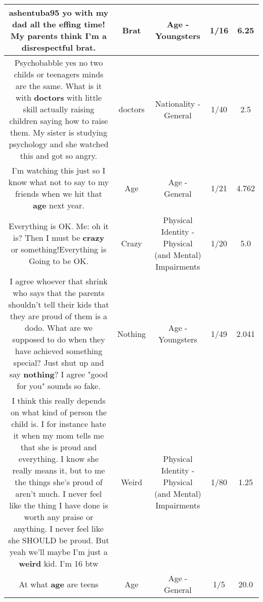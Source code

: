 \documentclass[11pt]{article}
\newlength\mylength
\begin{document}
\begin{center}
\begin{longtable}{|C{.65\mylength}|C{.30\mylength}|C{.12\mylength}|C{.12\mylength}|C{.12\mylength}|}
  \small ashentuba95  yo with my dad all the effing time! My parents think I'm a disrespectful \textbf{brat}.\normalsize   & Brat & Age - Youngsters & 1/16 & 6.25 \\  \hline
  \small Psychobabble yes no two childs or teenagers minds are the same. What is it with \textbf{doctors} with little skill actually raising children saying how to raise them. My sister is studying psychology and she watched this and got so angry.\normalsize   & doctors & Nationality - General & 1/40 & 2.5 \\  \hline
  \small I'm watching this just so I know what not to say to my friends when we hit that \textbf{age} next year.\normalsize   & Age & Age - General & 1/21 & 4.762 \\  \hline
  \small Everything is OK.  Me: oh it is?  Then I must be \textbf{crazy} or something!Everything is Going to be OK.\normalsize   & Crazy & Physical Identity - Physical (and Mental) Impairments & 1/20 & 5.0 \\  \hline
  \small I agree whoever that shrink who says that the parents shouldn't tell their kids that they are proud of them is a dodo.  What are we supposed to do when they have achieved something special?  Just shut up and say \textbf{nothing}?  I agree "good for you" sounds so fake.\normalsize   & Nothing & Age - Youngsters & 1/49 & 2.041 \\  \hline
  \small I think this really depends on what kind of person the child is. I for instance hate it when my mom tells me that she is proud and everything. I know she really means it, but to me the things she's proud of aren't much. I never feel like the thing I have done is worth any praise or anything. I never feel like she SHOULD be proud. But yeah we'll maybe I'm just a \textbf{weird} kid. I'm 16 btw\normalsize   & Weird & Physical Identity - Physical (and Mental) Impairments & 1/80 & 1.25 \\  \hline
  \small At what \textbf{age} are teens\normalsize   & Age & Age - General & 1/5 & 20.0 \\  \hline

\end{longtable}
\end{center}
\end{document}
